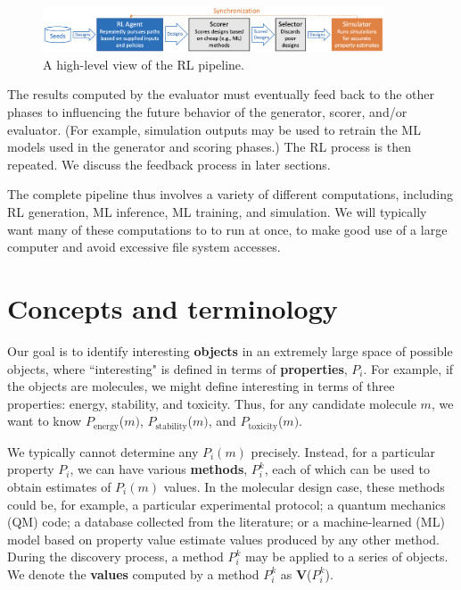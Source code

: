 \documentclass[10pt]{article}
\begin{document}
\begin{figure}[h]
  \centering
  \includegraphics[width=0.9\textwidth,trim=0in 0in 0in 0in,clip]{./Figs/pipe.png}
  \vspace{-1.5ex}
  \caption{A high-level view of the RL pipeline.}
\label{fig:pipe}
\end{figure}


The results computed by the evaluator must eventually feed back to the other phases to influencing the future behavior of the generator, scorer, and/or evaluator. 
(For example, simulation outputs may be used to retrain the ML models used in the generator and scoring phases.)
The RL process is then repeated.
We discuss the feedback process in later sections.

The complete pipeline thus involves a variety of different computations, including RL generation,  ML inference, ML training, and simulation.
We will typically want many of these computations to to run at once, to make good use of a large computer and avoid excessive file system accesses.


\section{Concepts and terminology}

Our goal is to identify interesting \textbf{objects} in an extremely large space of possible objects,
where ``interesting" is defined in terms of \textbf{properties}, $P_i$.
For example, if the objects are molecules, we might define interesting in terms of three properties: energy, stability, and toxicity.
Thus, for any candidate molecule $m$, we want to know $P_{\textrm{energy}}$($m)$, $P_{\textrm{stability}}$($m)$, and $P_{\textrm{toxicity}}$($m)$.

We typically cannot determine any $P_i(m)$ precisely. Instead, for a particular property $P_i$, we can have various \textbf{methods}, $P_i^k$, 
each of which can be used to obtain estimates of $P_i(m)$ values. In the molecular design case, these methods could be, for example, 
a particular experimental protocol; 
a quantum mechanics (QM) code; 
a database collected from the literature; or
a machine-learned (ML) model based on property value estimate values produced by any other method.
During the discovery process, a method $P_i^k$ may be applied to a series of objects. 
We denote the \textbf{values} computed by a method $P_i^k$ as \textbf{V}($P_i^k$).
\end{document}
